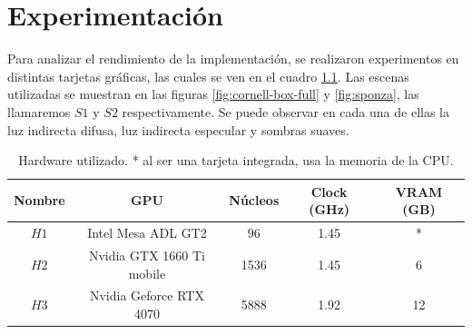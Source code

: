 \graphicspath{{chapters/5_experimentos/figures/}}

\chapter{Experimentación}\label{chap:experiments}

Para analizar el rendimiento de la implementación, se realizaron experimentos en distintas tarjetas gráficas, las cuales se ven en el cuadro \ref{tab:hardware-used}.
Las escenas utilizadas se muestran en las figuras \ref{fig:cornell-box-full} y \ref{fig:sponza}, las llamaremos $S1$ y $S2$ respectivamente.
Se puede observar en cada una de ellas la luz indirecta difusa, luz indirecta especular y sombras suaves.

\begin{table}[ht]
	\centering
	\begin{tabular}{|c|c|c|c|c|}
		\hline
		\textbf{Nombre} & \textbf{GPU} & \textbf{Núcleos} & \textbf{Clock (GHz)} & \textbf{VRAM (GB)} \\
		\hline
		$H1$ & Intel Mesa ADL GT2 & 96 & 1.45 & * \\
		\hline
		$H2$ & Nvidia GTX 1660 Ti mobile & 1536 & 1.45 & 6 \\
		\hline
		$H3$ & Nvidia Geforce RTX 4070 & 5888 & 1.92 & 12 \\
		\hline
	\end{tabular}
	\caption{Hardware utilizado. * al ser una tarjeta integrada, usa la memoria de la CPU.}
	\label{tab:hardware-used}
\end{table}

